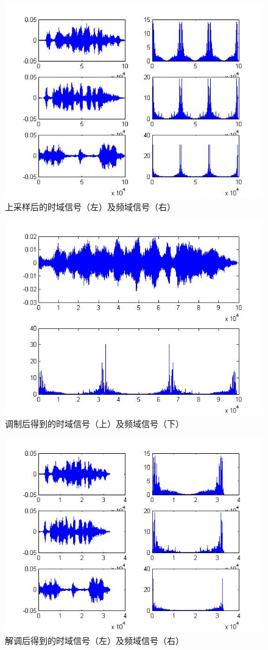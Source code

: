 \documentclass[12pt,a4paper]{article}
\begin{document}
\begin{figure}
    \centering
    \includegraphics[width=\textwidth]{fig/upsampled.jpg}
    \caption{上采样后的时域信号（左）及频域信号（右）}
    \label{fig:upsampled}
\end{figure}

\begin{figure}
    \centering
    \includegraphics[width=\textwidth]{fig/modulated.jpg}
    \caption{调制后得到的时域信号（上）及频域信号（下）}
    \label{fig:modulated}
\end{figure}

\begin{figure}
    \centering
    \includegraphics[width=\textwidth]{fig/decoded.jpg}
    \caption{解调后得到的时域信号（左）及频域信号（右）}
    \label{fig:decoded}
\end{figure}
\end{document}
